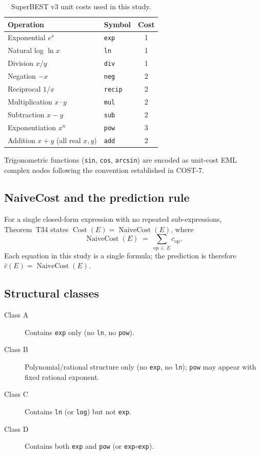 \documentclass[12pt,a4paper]{article}
\theoremstyle{definition}
\newcommand{\Cost}{\operatorname{Cost}}
\newcommand{\NC}{\operatorname{NaiveCost}}
\begin{document}
\begin{table}[h]
\centering
\caption{SuperBEST v3 unit costs used in this study.}
\label{tab:unitcosts}
\smallskip
\begin{tabular}{@{}llc@{}}
\toprule
\textbf{Operation}                       & \textbf{Symbol}    & \textbf{Cost} \\
\midrule
Exponential $e^x$                        & \texttt{exp}       & 1 \\
Natural log $\ln x$                      & \texttt{ln}        & 1 \\
Division $x/y$                           & \texttt{div}       & 1 \\
Negation $-x$                            & \texttt{neg}       & 2 \\
Reciprocal $1/x$                         & \texttt{recip}     & 2 \\
Multiplication $x \cdot y$               & \texttt{mul}       & 2 \\
Subtraction $x - y$                      & \texttt{sub}       & 2 \\
Exponentiation $x^n$                     & \texttt{pow}       & 3 \\
Addition $x+y$ (all real $x,y$)          & \texttt{add}       & 2 \\
\bottomrule
\end{tabular}
\end{table}

Trigonometric functions (\texttt{sin}, \texttt{cos}, \texttt{arcsin}) are
encoded as unit-cost EML complex nodes following the convention established
in COST-7.

\subsection{NaiveCost and the prediction rule}

For a single closed-form expression with no repeated sub-expressions,
Theorem~T34 states $\Cost(E) = \NC(E)$, where
\[
  \NC(E) \;=\; \sum_{\text{op}\,\in\, E} c_{\mathrm{op}}.
\]
Each equation in this study is a single formula; the prediction is therefore
$\hat{c}(E) = \NC(E)$.

\subsection{Structural classes}

\begin{description}
  \item[Class A] Contains \texttt{exp} only (no \texttt{ln}, no \texttt{pow}).
  \item[Class B] Polynomial/rational structure only (no \texttt{exp}, no
        \texttt{ln}); \texttt{pow} may appear with fixed rational exponent.
  \item[Class C] Contains \texttt{ln} (or \texttt{log}) but not \texttt{exp}.
  \item[Class D] Contains both \texttt{exp} and \texttt{pow} (or
        \texttt{exp}$\circ$\texttt{exp}).
\end{description}
\end{document}
